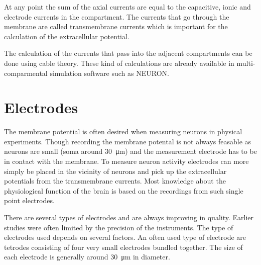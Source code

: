 \documentclass[altfont, fleqn]{uiophd}
\begin{document}
At any point the sum of the axial currents are equal to
the capacitive, ionic and electrode currents in the compartment. 
The currents that go through the membrane are called transmembrane currents
which is important for the calculation of the extracellular potential. 

The calculation of the currents that pass into the adjacent compartments
can be done using cable theory. 
These kind of calculations are already available in multi-comparmental
simulation software such as NEURON. 

\section{Electrodes}
The membrane potential is often desired 
when measuring neurons in physical experiments. 
Though recording the membrane potental is not always feasable 
as neurons are small (soma around 
\SI{30}{\micro\metre}) and the measurement electrode
has to be in contact with the membrane. 
To measure neuron activity electrodes can more simply be placed
in the vicinity of neurons and pick up the extracellular
potentials from the transmembrane currents. 
Most knowledge about the physiological function of the brain is 
based on the recordings from such single point electrodes. 

There are several types of electrodes and are always improving
in quality. 
Earlier studies were often limited by the precision of the instruments. 
The type of electrodes used depends on several factors. 
An often used type of electrode are tetrodes consisting of 
four very small electrodes bundled together. 
The size of each electrode is generally around
\SI{30}{\micro\metre} in diameter. 


\end{document}

